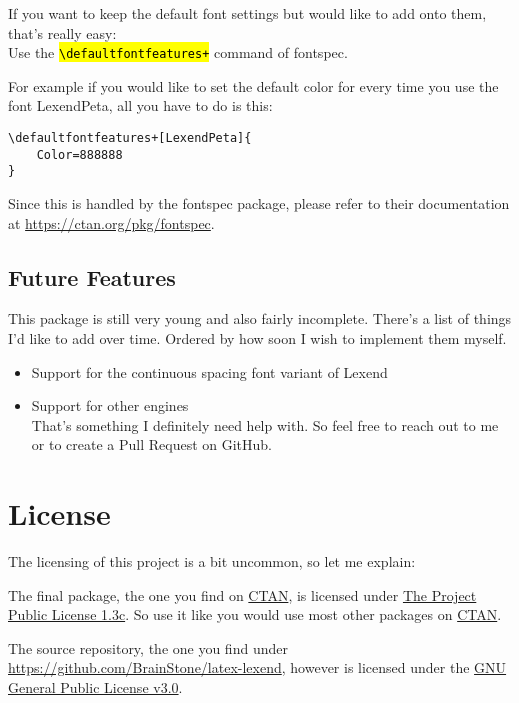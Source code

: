 \documentclass[oneside,a4paper]{l3doc}
\DeclareRobustCommand{\code}[1]{{\sethlcolor{lightgray}\texttt{\hl{#1}}}}
\providecommand{\tightlist}{%
  \setlength{\itemsep}{0pt}\setlength{\parskip}{0pt}}
\begin{document}
If you want to keep the default font settings but would like to add onto them, that's really easy:\\
Use the \code{\textbackslash{}defaultfontfeatures+} command of \textsf{fontspec}.

\bigskip

For example if you would like to set the default color for every time you use the font
\textsf{LexendPeta}, all you have to do is this:

\begin{lstlisting}[language={[LaTeX]TeX},caption={\code{\textbackslash{}defaultfontfeatures+} Example}]
\defaultfontfeatures+[LexendPeta]{
	Color=888888
}
\end{lstlisting}

Since this is handled by the \textsf{fontspec} package, please refer to their documentation at
\url{https://ctan.org/pkg/fontspec}.

\subsection{Future Features}\label{subsec:future-features}

This package is still very young and also fairly incomplete. There's a list of things I'd like to
add over time. Ordered by how soon I wish to implement them myself.

\begin{itemize}
\item Support for the continuous spacing font variant of Lexend\tightlist
\item Support for other  engines\\
	That's something I definitely need help with. So feel free to reach out to me or to create a
	Pull Request on GitHub.\tightlist
\end{itemize}

\section{License}

The licensing of this project is a bit uncommon, so let me explain:

The final package, the one you find on \href{https://ctan.org/}{CTAN}, is licensed under
\href{https://ctan.org/license/lppl1.3c}{The  Project Public License 1.3c}. So use it
like you would use most other packages on \href{https://ctan.org/}{CTAN}.

The source repository, the one you find under \url{https://github.com/BrainStone/latex-lexend},
however is licensed under the \href{https://www.gnu.org/licenses/gpl-3.0.html}{GNU General Public
License v3.0}.
\end{document}
